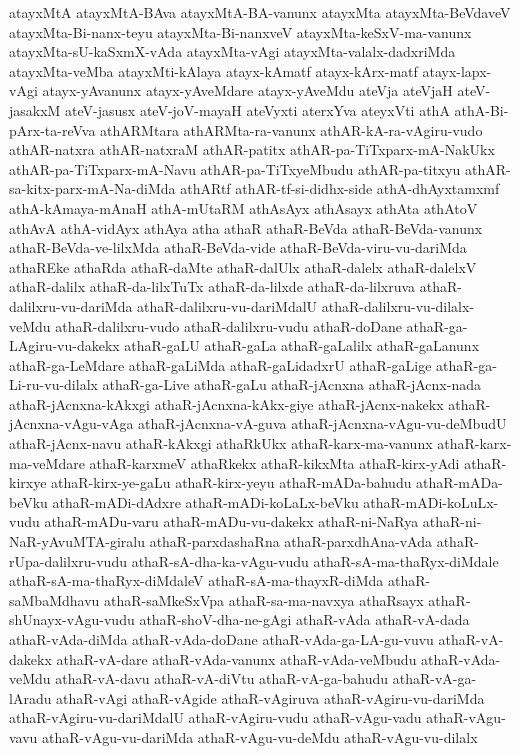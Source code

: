 {atayxMtA
atayxMtA-BAva
atayxMtA-BA-vanunx
atayxMta
atayxMta-BeVdaveV
atayxMta-Bi-nanx-teyu
atayxMta-Bi-nanxveV
atayxMta-keSxV-ma-vanunx
atayxMta-sU-kaSxmX-vAda
atayxMta-vAgi
atayxMta-valalx-dadxriMda
atayxMta-veMba
atayxMti-kAlaya
atayx-kAmatf
atayx-kArx-matf
atayx-lapx-vAgi
atayx-yAvanunx
atayx-yAveMdare
atayx-yAveMdu
ateVja
ateVjaH
ateV-jasakxM
ateV-jasusx
ateV-joV-mayaH
ateVyxti
aterxYva
ateyxVti
athA
athA-Bi-pArx-ta-reVva
athARMtara
athARMta-ra-vanunx
athAR-kA-ra-vAgiru-vudo
athAR-natxra
athAR-natxraM
athAR-patitx
athAR-pa-TiTxparx-mA-NakUkx
athAR-pa-TiTxparx-mA-Navu
athAR-pa-TiTxyeMbudu
athAR-pa-titxyu
athAR-sa-kitx-parx-mA-Na-diMda
athARtf
athAR-tf-si-didhx-side
athA-dhAyxtamxmf
athA-kAmaya-mAnaH
athA-mUtaRM
athAsAyx
athAsayx
athAta
athAtoV
athAvA
athA-vidAyx
athAya
atha
athaR
athaR-BeVda
athaR-BeVda-vanunx
athaR-BeVda-ve-lilxMda
athaR-BeVda-vide
athaR-BeVda-viru-vu-dariMda
athaREke
athaRda
athaR-daMte
athaR-dalUlx
athaR-dalelx
athaR-dalelxV
athaR-dalilx
athaR-da-lilxTuTx
athaR-da-lilxde
athaR-da-lilxruva
athaR-dalilxru-vu-dariMda
athaR-dalilxru-vu-dariMdalU
athaR-dalilxru-vu-dilalx-veMdu
athaR-dalilxru-vudo
athaR-dalilxru-vudu
athaR-doDane
athaR-ga-LAgiru-vu-dakekx
athaR-gaLU
athaR-gaLa
athaR-gaLalilx
athaR-gaLanunx
athaR-ga-LeMdare
athaR-gaLiMda
athaR-gaLidadxrU
athaR-gaLige
athaR-ga-Li-ru-vu-dilalx
athaR-ga-Live
athaR-gaLu
athaR-jAcnxna
athaR-jAcnx-nada
athaR-jAcnxna-kAkxgi
athaR-jAcnxna-kAkx-giye
athaR-jAcnx-nakekx
athaR-jAcnxna-vAgu-vAga
athaR-jAcnxna-vA-guva
athaR-jAcnxna-vAgu-vu-deMbudU
athaR-jAcnx-navu
athaR-kAkxgi
athaRkUkx
athaR-karx-ma-vanunx
athaR-karx-ma-veMdare
athaR-karxmeV
athaRkekx
athaR-kikxMta
athaR-kirx-yAdi
athaR-kirxye
athaR-kirx-ye-gaLu
athaR-kirx-yeyu
athaR-mADa-bahudu
athaR-mADa-beVku
athaR-mADi-dAdxre
athaR-mADi-koLaLx-beVku
athaR-mADi-koLuLx-vudu
athaR-mADu-varu
athaR-mADu-vu-dakekx
athaR-ni-NaRya
athaR-ni-NaR-yAvuMTA-giralu
athaR-parxdashaRna
athaR-parxdhAna-vAda
athaR-rUpa-dalilxru-vudu
athaR-sA-dha-ka-vAgu-vudu
athaR-sA-ma-thaRyx-diMdale
athaR-sA-ma-thaRyx-diMdaleV
athaR-sA-ma-thayxR-diMda
athaR-saMbaMdhavu
athaR-saMkeSxVpa
athaR-sa-ma-navxya
athaRsayx
athaR-shUnayx-vAgu-vudu
athaR-shoV-dha-ne-gAgi
athaR-vAda
athaR-vA-dada
athaR-vAda-diMda
athaR-vAda-doDane
athaR-vAda-ga-LA-gu-vuvu
athaR-vA-dakekx
athaR-vA-dare
athaR-vAda-vanunx
athaR-vAda-veMbudu
athaR-vAda-veMdu
athaR-vA-davu
athaR-vA-diVtu
athaR-vA-ga-bahudu
athaR-vA-ga-lAradu
athaR-vAgi
athaR-vAgide
athaR-vAgiruva
athaR-vAgiru-vu-dariMda
athaR-vAgiru-vu-dariMdalU
athaR-vAgiru-vudu
athaR-vAgu-vadu
athaR-vAgu-vavu
athaR-vAgu-vu-dariMda
athaR-vAgu-vu-deMdu
athaR-vAgu-vu-dilalx
}
